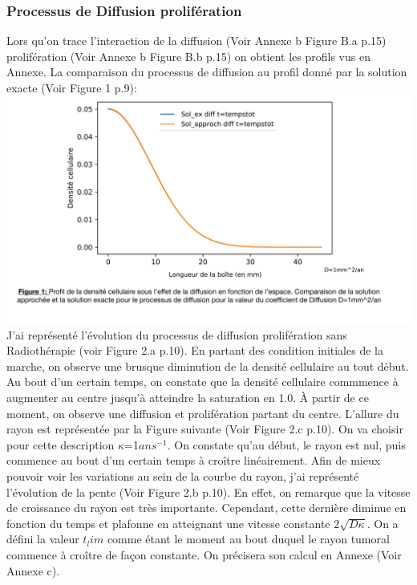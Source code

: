 \documentclass[12pt,a4paper]{article}
\begin{document}
\subsubsection{Processus de Diffusion prolifération}
Lors qu'on trace l'interaction de la diffusion (Voir Annexe b Figure B.a p.15) prolifération (Voir Annexe b Figure B.b p.15) on obtient les profils vus en Annexe. La comparaison du processus de diffusion au profil donné par la solution exacte (Voir Figure 1 p.9): 
\\
\includegraphics[page=1,scale=0.25]{FIGURES.pdf} 
\\
J'ai représenté l'évolution du processus de diffusion prolifération sans Radiothérapie (voir Figure 2.a p.10). En partant des condition initiales de la marche, on observe une brusque diminution de la densité cellulaire au tout début. Au bout d'un certain temps, on constate que la densité cellulaire commmence à augmenter au centre jusqu'à atteindre la saturation en 1.0. À partir de ce moment, on observe une diffusion et prolifération partant du centre. 
L'allure du rayon est représentée par la Figure suivante (Voir Figure 2.c p.10). On va choisir pour cette description $\kappa$=1$ans^{-1}$. On constate qu'au début, le rayon est nul, puis commence au bout d'un certain temps à croître linéairement.  Afin de mieux pouvoir voir les variations au sein de la courbe du rayon, j'ai représenté l'évolution de la pente (Voir Figure 2.b p.10). En effet, on remarque que la vitesse de croissance du rayon est très importante. Cependant, cette dernière diminue en fonction du temps et plafonne en atteignant une vitesse constante $2\sqrt{D\kappa}$. On a défini la valeur $t_lim$ comme étant le moment au bout duquel le rayon tumoral commence à croître de façon constante. On précisera son calcul en Annexe (Voir Annexe c). 
\\
\\
\end{document}
